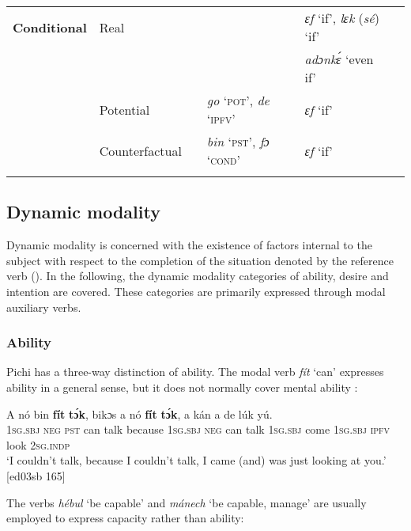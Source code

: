 \begin{sidewaystable}
\begin{tabularx}{\textwidth}{llQQQQ}
\midrule
\textbf{Conditional} &  Real &  &  & \textit{ɛf} ‘if’, \textit{ lɛk} (\textit{sé}) ‘if’ & \\
&&  &  & \textit{adɔnkɛ́} ‘even if’ & \\
&Potential &  & \textit{go} {‘}{\textsc{pot}}{’,} \textit{de} {‘}{\textsc{ipfv}}{’} & \textit{ɛf} ‘if’ & \\
&Counterfactual &  & \textit{bin} {‘}{\textsc{pst}}{’,} \textit{fɔ} {‘}{\textsc{cond’}} & \textit{ɛf} ‘if’ & \\
\lspbottomrule
\end{tabularx}
\end{sidewaystable}

\subsection{Dynamic modality}

Dynamic modality is concerned with the existence of factors internal to the subject with respect to the completion of the situation denoted by the reference verb (\citealt[76]{Palmer2001}). In the following, the dynamic modality categories of ability, desire and intention are covered. These categories are primarily expressed through modal auxiliary verbs.

\subsubsection{Ability}\label{sec:6.7.2.1}

Pichi has a three-way distinction of ability. The modal verb \textit{fít} ‘can’ expresses ability in a general sense, but it does not normally cover mental ability : 


\ea%
    \label{ex:key:406}
    \gll \MakeUppercase{A}   nó  bin  \textbf{fít} \textbf{tɔ́k},    bikɔs  a    nó  \textbf{fít} \textbf{tɔ́k},
a    kán    a    de  lúk    yú.\\
\textsc{1sg.sbj}  \textsc{neg}  \textsc{pst}  can  talk    because  \textsc{1sg.sbj}  \textsc{neg}  can  talk
\textsc{1sg.sbj}  come  \textsc{1sg.sbj}  \textsc{ipfv}  look    \textsc{2sg.indp}\\

\glt ‘I couldn’t talk, because I couldn’t talk, I came (and) was just looking at you.’ [ed03sb 165]
\z

The verbs \textit{hébul} ‘be capable’  and \textit{mánech} ‘be capable, manage’  are usually employed to express capacity rather than ability:


